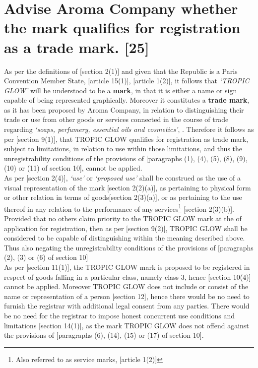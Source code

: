 \documentclass[11pt]{article}
\begin{document}
\section{Advise Aroma Company whether the mark qualifies for registration as a trade mark. [25]}
\label{sec:orge7e4e5f}
As per the definitions of [section 2(1)]\cite{rsa93_tm_act} and given that the
Republic is a Paris Convention Member State, [article 15(1)]\cite{wto17_trips},
[article 1(2)]\cite{wipo83_paris_conve_protect_ip}, it follows that \emph{`TROPIC
GLOW'} will be understood to be a \textbf{mark}, in that it is either a name or sign
capable of being represented graphically. Moreover it constitutes a \textbf{trade
mark}, as it has been proposed by Aroma Company, in relation to distinguishing
their trade or use from other goods or services connected in the course of trade
regarding \emph{`soaps, perfumery, essential oils and cosmetics'}, \cite{wipo57_ncl}. Therefore it
follows as per [section 9(1)]\cite{rsa93_tm_act}, that TROPIC GLOW qualifies for
registration as trade mark, subject to limitations, in relation to use within
those limitations, and thus the unregistrability conditions of the
provisions of [paragraphs (1), (4), (5), (8), (9), (10) or (11) of section 10]\cite{rsa93_tm_act},
cannot be applied.\\

As per [section 2(4)]\cite{rsa93_tm_act}, \emph{`use'} or \emph{`proposed use'} shall be
construed as the use of a visual representation of the mark [section
2(2)(a)]\cite{rsa93_tm_act}, as pertaining to physical form or other relation in
terms of goods[section 2(3)(a)]\cite{rsa93_tm_act}, or as pertaining to the use
thereof in any relation to the performance of any services\footnote{Also referred to
as service marks, [article 1(2)]\cite{wipo83_paris_conve_protect_ip}} [section
2(3)(b)]\cite{rsa93_tm_act}. Provided that no others claim priority to the TROPIC
GLOW mark at the  of application for registration, then as per [section
9(2)]\cite{rsa93_tm_act}, TROPIC GLOW shall be considered to be capable of
distinguishing within the meaning described above. Thus also negating the
unregistrability conditions of the provisions of [paragraphs (2), (3) or (6) of section 10]\cite{rsa93_tm_act}\\

As per [section 11(1)]\cite{rsa93_tm_act}, the TROPIC GLOW mark is proposed to be
registered in respect of goods falling in a particular class, namely class 3,
hence [section 10(4)]\cite{rsa93_tm_act} cannot be applied. Moreover TROPIC GLOW
does not include or consist of the name or representation of a person [section
12]\cite{rsa93_tm_act}, hence there would be no need to furnish the registrar with
additional legal consent from any parties. There would be no need for the
registrar to impose honest concurrent use conditions and limitations [section
14(1)]\cite{rsa93_tm_act}, as the mark TROPIC GLOW does not offend against the
provisions of [paragraphs (6), (14), (15) or (17) of section
10]\cite{rsa93_tm_act}.\\
\end{document}
